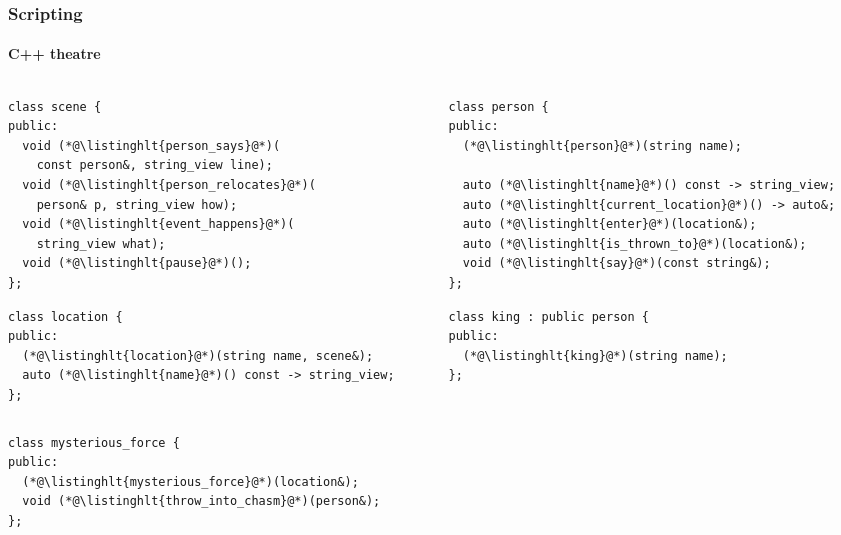 \documentclass[compress,table,xcolor=table]{beamer}
\begin{document}
\begin{frame}[fragile]
  \frametitle{Scripting}
  \framesubtitle{C++ theatre}
  \begin{columns}
    \begin{column}{.50\textwidth}
    \begin{lstlisting}[language=c++2x,basicstyle=\tiny\ttfamily]
class scene {
public:
  void (*@\listinghlt{person_says}@*)(
    const person&, string_view line);
  void (*@\listinghlt{person_relocates}@*)(
    person& p, string_view how);
  void (*@\listinghlt{event_happens}@*)(
    string_view what);
  void (*@\listinghlt{pause}@*)();
};

    \end{lstlisting}
    \begin{lstlisting}[language=c++2x,basicstyle=\tiny\ttfamily]
class location {
public:
  (*@\listinghlt{location}@*)(string name, scene&);
  auto (*@\listinghlt{name}@*)() const -> string_view;
};
    \end{lstlisting}
    \end{column}
    \begin{column}{.50\textwidth}
    \begin{lstlisting}[language=c++2x,basicstyle=\tiny\ttfamily]
class person {
public:
  (*@\listinghlt{person}@*)(string name);

  auto (*@\listinghlt{name}@*)() const -> string_view;
  auto (*@\listinghlt{current_location}@*)() -> auto&;
  auto (*@\listinghlt{enter}@*)(location&);
  auto (*@\listinghlt{is_thrown_to}@*)(location&);
  void (*@\listinghlt{say}@*)(const string&);
};
    \end{lstlisting}
    \begin{lstlisting}[language=c++2x,basicstyle=\tiny\ttfamily]
class king : public person {
public:
  (*@\listinghlt{king}@*)(string name);
};
    \end{lstlisting}
    \end{column}
  \end{columns}
  \begin{lstlisting}[language=c++2x,basicstyle=\scriptsize\ttfamily]
class mysterious_force {
public:
  (*@\listinghlt{mysterious_force}@*)(location&);
  void (*@\listinghlt{throw_into_chasm}@*)(person&);
};
    \end{lstlisting}
\end{frame}
\end{document}

